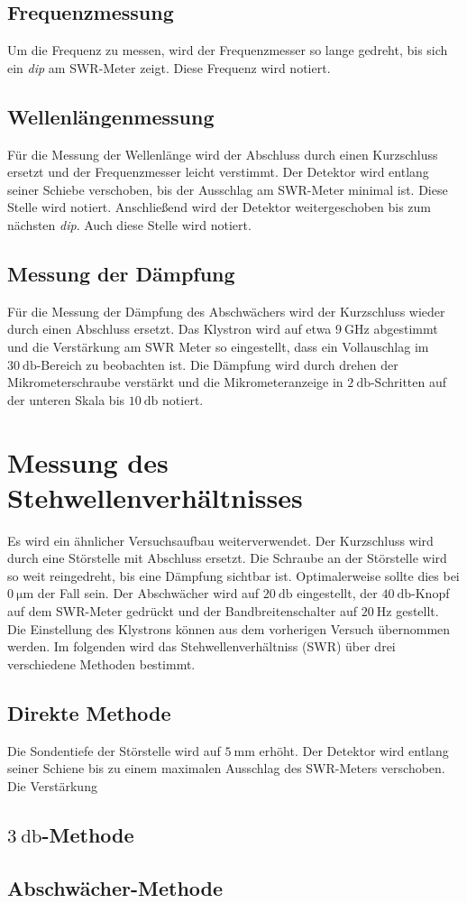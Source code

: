 \subsection{Frequenzmessung}
Um die Frequenz zu messen, wird der Frequenzmesser so lange gedreht, bis sich ein \textit{dip} am SWR-Meter zeigt. Diese Frequenz wird notiert.

\subsection{Wellenlängenmessung}
Für die Messung der Wellenlänge wird der Abschluss durch einen Kurzschluss ersetzt und der Frequenzmesser leicht verstimmt. Der Detektor wird entlang seiner Schiebe verschoben, bis der Ausschlag am SWR-Meter minimal ist.
Diese Stelle wird notiert. Anschließend wird der Detektor weitergeschoben bis zum nächsten \textit{dip}. Auch diese Stelle wird notiert.

\subsection{Messung der Dämpfung}
Für die Messung der Dämpfung des Abschwächers wird der Kurzschluss wieder durch einen Abschluss ersetzt. Das Klystron wird auf etwa $\qty{9}{\giga\hertz}$ abgestimmt und die Verstärkung am SWR Meter so eingestellt, dass 
ein Vollauschlag im $\qty{30}{\decibel}$-Bereich zu beobachten ist. Die Dämpfung wird durch drehen der Mikrometerschraube verstärkt und die Mikrometeranzeige in $\qty{2}{\decibel}$-Schritten auf der unteren Skala bis 
$\qty{10}{\decibel}$ notiert.

\section{Messung des Stehwellenverhältnisses}
Es wird ein ähnlicher Versuchsaufbau weiterverwendet. Der Kurzschluss wird durch eine Störstelle mit Abschluss ersetzt. Die Schraube an der Störstelle wird so weit reingedreht, bis eine Dämpfung sichtbar ist. Optimalerweise
sollte dies bei $\qty{0}{\micro\metre}$ der Fall sein. Der Abschwächer wird auf $\qty{20}{\decibel}$ eingestellt, der $\qty{40}{\decibel}$-Knopf
auf dem SWR-Meter gedrückt und der Bandbreitenschalter auf $\qty{20}{\hertz}$ gestellt. Die Einstellung des Klystrons können aus dem vorherigen Versuch übernommen werden. Im folgenden wird das Stehwellenverhältniss (SWR)
über drei verschiedene Methoden bestimmt.

\subsection{Direkte Methode}
Die Sondentiefe der Störstelle wird auf $\qty{5}{\milli\metre}$ erhöht. Der Detektor wird entlang seiner Schiene bis zu einem maximalen Ausschlag des SWR-Meters verschoben. Die Verstärkung 

\subsection{$\qty{3}{\decibel}$-Methode}

\subsection{Abschwächer-Methode}